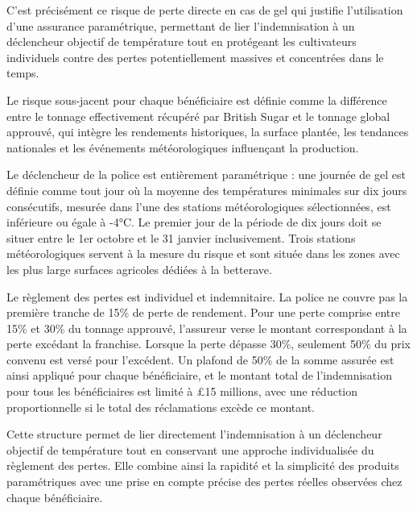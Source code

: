 \documentclass[11pt,a4paper,openright,twoside]{report}
\begin{document}
C’est précisément ce risque de perte directe en cas de gel qui justifie l’utilisation d’une assurance paramétrique, permettant de lier l’indemnisation à un déclencheur objectif de température tout en protégeant les cultivateurs individuels contre des pertes potentiellement massives et concentrées dans le temps.

Le risque sous-jacent pour chaque bénéficiaire est définie comme la différence entre le tonnage effectivement récupéré par British Sugar et le tonnage global approuvé, qui intègre les rendements historiques, la surface plantée, les tendances nationales et les événements météorologiques influençant la production.  

Le déclencheur de la police est entièrement paramétrique : une journée de gel est définie comme tout jour où la moyenne des températures minimales sur dix jours consécutifs, mesurée dans l’une des stations météorologiques sélectionnées, est inférieure ou égale à -4°C. Le premier jour de la période de dix jours doit se situer entre le 1er octobre et le 31 janvier inclusivement. Trois stations météorologiques servent à la mesure du risque et sont située dans les zones avec les plus large surfaces agricoles dédiées à la betterave.  

Le règlement des pertes est individuel et indemnitaire. La police ne couvre pas la première tranche de 15\% de perte de rendement. Pour une perte comprise entre 15\% et 30\% du tonnage approuvé, l’assureur verse le montant correspondant à la perte excédant la franchise. Lorsque la perte dépasse 30\%, seulement 50\% du prix convenu est versé pour l’excédent. Un plafond de 50\% de la somme assurée est ainsi appliqué pour chaque bénéficiaire, et le montant total de l’indemnisation pour tous les bénéficiaires est limité à £15 millions, avec une réduction proportionnelle si le total des réclamations excède ce montant.  

Cette structure permet de lier directement l’indemnisation à un déclencheur objectif de température tout en conservant une approche individualisée du règlement des pertes. Elle combine ainsi la rapidité et la simplicité des produits paramétriques avec une prise en compte précise des pertes réelles observées chez chaque bénéficiaire.
\end{document}
